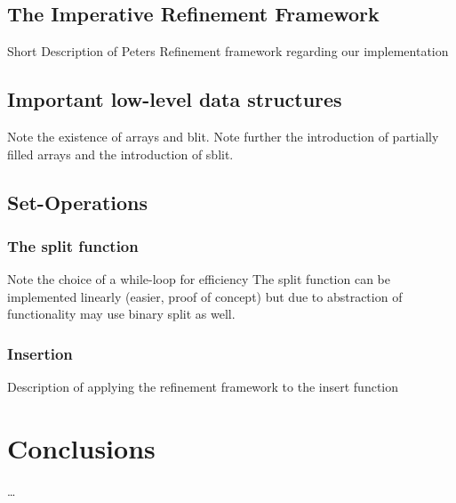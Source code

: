 \section{The Imperative Refinement Framework}

Short Description of Peters Refinement framework regarding our implementation

\section{Important low-level data structures}

Note the existence of arrays and blit.
Note further the introduction of partially filled arrays
and the introduction of sblit.

\section{Set-Operations}

\subsection{The split function}

Note the choice of a while-loop for efficiency
The split function can be implemented linearly (easier, proof of concept)
but due to abstraction of functionality may use binary split as well.

\subsection{Insertion}

Description of applying the refinement framework to the insert function

\chapter{Conclusions}

\dots